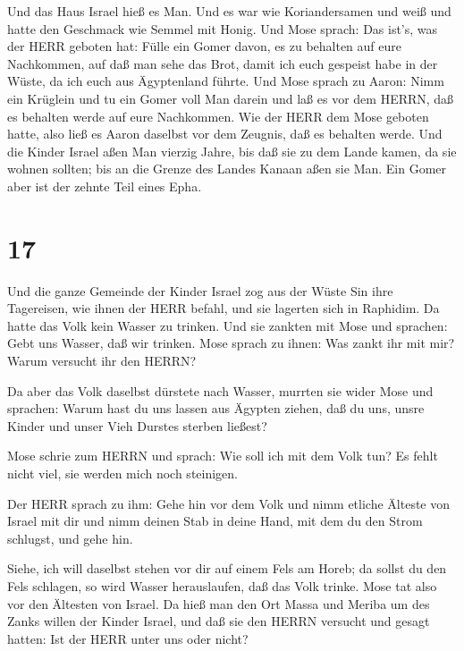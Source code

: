  Und das Haus Israel hieß es Man. Und es war wie
Koriandersamen und weiß und hatte den Geschmack wie Semmel mit Honig.
 Und Mose sprach: Das ist's, was der HERR geboten hat:
Fülle ein Gomer davon, es zu behalten auf eure Nachkommen, auf daß man
sehe das Brot, damit ich euch gespeist habe in der Wüste, da ich euch
aus Ägyptenland führte.  Und Mose sprach zu Aaron: Nimm ein
Krüglein und tu ein Gomer voll Man darein und laß es vor dem HERRN, daß
es behalten werde auf eure Nachkommen.  Wie der HERR dem
Mose geboten hatte, also ließ es Aaron daselbst vor dem Zeugnis, daß es
behalten werde.  Und die Kinder Israel aßen Man vierzig
Jahre, bis daß sie zu dem Lande kamen, da sie wohnen sollten; bis an die
Grenze des Landes Kanaan aßen sie Man.  Ein Gomer aber ist
der zehnte Teil eines Epha.

\hypertarget{section-16}{%
\section{17}\label{section-16}}

 Und die ganze Gemeinde der Kinder Israel zog aus der Wüste
Sin ihre Tagereisen, wie ihnen der HERR befahl, und sie lagerten sich in
Raphidim. Da hatte das Volk kein Wasser zu trinken.  Und sie
zankten mit Mose und sprachen: Gebt uns Wasser, daß wir trinken. Mose
sprach zu ihnen: Was zankt ihr mit mir? Warum versucht ihr den HERRN?

 Da aber das Volk daselbst dürstete nach Wasser, murrten sie
wider Mose und sprachen: Warum hast du uns lassen aus Ägypten ziehen,
daß du uns, unsre Kinder und unser Vieh Durstes sterben ließest?

 Mose schrie zum HERRN und sprach: Wie soll ich mit dem Volk
tun? Es fehlt nicht viel, sie werden mich noch steinigen.

 Der HERR sprach zu ihm: Gehe hin vor dem Volk und nimm
etliche Älteste von Israel mit dir und nimm deinen Stab in deine Hand,
mit dem du den Strom schlugst, und gehe hin.

 Siehe, ich will daselbst stehen vor dir auf einem Fels am
Horeb; da sollst du den Fels schlagen, so wird Wasser herauslaufen, daß
das Volk trinke. Mose tat also vor den Ältesten von Israel. 
Da hieß man den Ort Massa und Meriba um des Zanks willen der Kinder
Israel, und daß sie den HERRN versucht und gesagt hatten: Ist der HERR
unter uns oder nicht?

